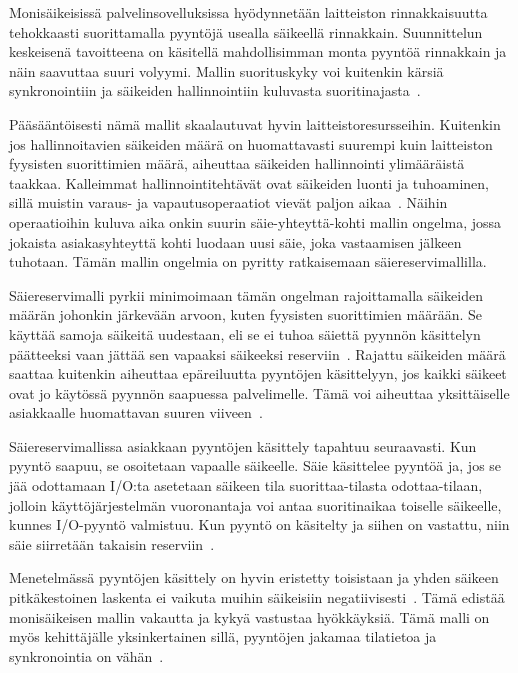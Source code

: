 \documentclass[finnish]{tktltiki2}%
\theoremstyle{definition}
\theoremstyle{remark}
\begin{document}
Monisäikeisissä palvelinsovelluksissa hyödynnetään laitteiston
rinnakkaisuutta tehokkaasti suorittamalla pyyntöjä usealla säikeellä rinnakkain.
Suunnittelun keskeisenä tavoitteena on käsitellä mahdollisimman monta pyyntöä rinnakkain ja
näin saavuttaa suuri volyymi. Mallin suorituskyky voi kuitenkin
kärsiä synkronointiin ja säikeiden hallinnointiin kuluvasta
suoritinajasta~\cite{hu_applying_1998}.

Pääsääntöisesti nämä mallit skaalautuvat hyvin laitteistoresursseihin.
Kuitenkin jos hallinnoitavien säikeiden määrä on huomattavasti suurempi kuin laitteiston
fyysisten suorittimien määrä, aiheuttaa säikeiden hallinnointi ylimääräistä taakkaa.
Kalleimmat hallinnointitehtävät ovat säikeiden luonti ja tuhoaminen, sillä
muistin varaus- ja vapautusoperaatiot vievät paljon aikaa~\cite{ling_analysis_2000}.
Näihin operaatioihin kuluva aika onkin suurin säie-yhteyttä-kohti mallin
ongelma, jossa jokaista asiakasyhteyttä kohti
luodaan uusi säie, joka vastaamisen jälkeen tuhotaan.
Tämän mallin ongelmia on pyritty ratkaisemaan säiereservimallilla.

Säiereservimalli pyrkii minimoimaan tämän ongelman rajoittamalla
säikeiden määrän johonkin järkevään arvoon, kuten fyysisten suorittimien
määrään. Se käyttää samoja säikeitä uudestaan, eli se ei tuhoa säiettä
pyynnön käsittelyn päätteeksi vaan jättää sen vapaaksi säikeeksi reserviin~\cite{ling_analysis_2000}. Rajattu säikeiden määrä saattaa kuitenkin aiheuttaa epäreiluutta
pyyntöjen käsittelyyn, jos kaikki säikeet ovat jo käytössä pyynnön
saapuessa palvelimelle. Tämä voi aiheuttaa yksittäiselle asiakkaalle
huomattavan suuren viiveen~\cite{welsh_seda_2001}.

Säiereservimallissa asiakkaan pyyntöjen käsittely tapahtuu seuraavasti.
Kun pyyntö saapuu, se osoitetaan vapaalle säikeelle. Säie käsittelee pyyntöä ja,
jos se jää odottamaan I/O:ta asetetaan säikeen tila suorittaa-tilasta odottaa-tilaan,
jolloin käyttöjärjestelmän vuoronantaja voi antaa suoritinaikaa toiselle säikeelle,
kunnes I/O-pyyntö valmistuu. Kun pyyntö on käsitelty ja siihen on vastattu, niin
säie siirretään takaisin reserviin~\cite{ling_analysis_2000}.

Menetelmässä pyyntöjen käsittely on hyvin eristetty toisistaan ja
yhden säikeen pitkäkestoinen laskenta ei vaikuta muihin säikeisiin negatiivisesti~\cite{davis_case_2017}.
Tämä edistää monisäikeisen mallin vakautta ja kykyä vastustaa hyökkäyksiä.
Tämä malli on myös kehittäjälle yksinkertainen sillä, pyyntöjen jakamaa tilatietoa
ja synkronointia on vähän~\cite{hu_applying_1998}.
\end{document}
